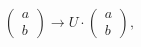 \begin{equation}
 \left(\begin{array}{c}
 {a}\\
 {b}
 \end{array}\right)\to U\cdot
 \left(\begin{array}{c}
 a\\
 b
 \end{array}\right),
\label{t1}\end{equation}

